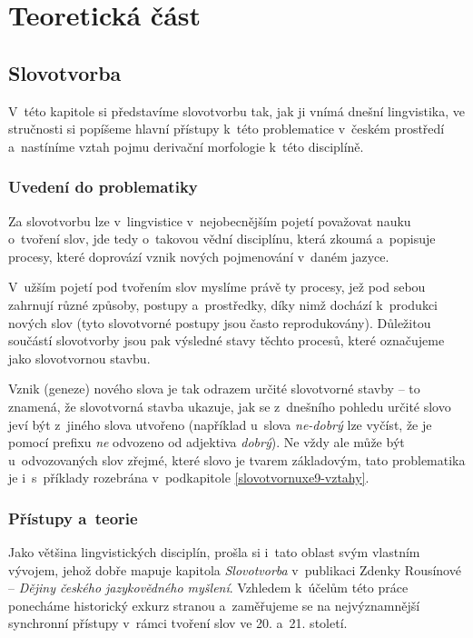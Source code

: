 \part{Teoretická část}

\hypertarget{slovotvorba}{%
\chapter{Slovotvorba}\label{slovotvorba}}

V~této kapitole si představíme slovotvorbu tak, jak ji vnímá dnešní
lingvistika, ve stručnosti si popíšeme hlavní přístupy k~této
problematice v~českém prostředí a~nastíníme vztah pojmu derivační
morfologie k~této disciplíně.

\hypertarget{uvedenuxed-do-problematiky}{%
\section{Uvedení do problematiky}\label{uvedenuxed-do-problematiky}}

Za slovotvorbu lze v~lingvistice v~nejobecnějším pojetí považovat nauku
o~tvoření slov, jde tedy o~takovou vědní disciplínu, která zkoumá
a~popisuje procesy, které doprovází vznik nových pojmenování v~daném
jazyce.

V~užším pojetí pod tvořením slov myslíme právě ty procesy, jež pod sebou
zahrnují různé způsoby, postupy a~prostředky, díky nimž dochází
k~produkci nových slov (tyto slovotvorné postupy jsou často
reprodukovány). Důležitou součástí slovotvorby jsou pak výsledné stavy
těchto procesů, které označujeme jako slovotvornou stavbu.
\parencite[92]{dokulil00}

Vznik (geneze) nového slova je tak odrazem určité slovotvorné stavby --
to znamená, že slovotvorná stavba ukazuje, jak se z~dnešního pohledu
určité slovo jeví být z~jiného slova utvořeno (například u~slova
\emph{ne-dobrý} lze vyčíst, že je pomocí prefixu \emph{ne} odvozeno od
adjektiva \emph{dobrý}). Ne vždy ale může být u~odvozovaných slov
zřejmé, které slovo je tvarem základovým, tato problematika je
i~s~příklady rozebrána v~podkapitole \ref{slovotvornuxe9-vztahy}.
\parencite[92--93]{dokulil00}

\hypertarget{pux159uxedstupy-a-teorie}{%
\section{Přístupy a~teorie}\label{pux159uxedstupy-a-teorie}}

Jako většina lingvistických disciplín, prošla si i~tato oblast svým
vlastním vývojem, jehož dobře mapuje kapitola \emph{Slovotvorba}
v~publikaci Zdenky Rousínové -- \emph{Dějiny českého jazykovědného
myšlení}. Vzhledem k~účelům této práce ponecháme historický exkurz
stranou a~zaměřujeme se na nejvýznamnější synchronní přístupy v~rámci
tvoření slov ve 20. a~21. století.

